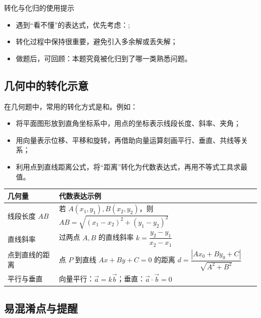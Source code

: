 \documentclass[a4paper,11pt]{ctexart}
\begin{document}
\begin{summarybox}{转化与化归的使用提示}
\begin{itemize}
  \item 遇到“看不懂”的表达式，优先考虑：;
  \item 转化过程中保持很重要，避免引入多余解或丢失解；
  \item 做题后，可回顾：本题究竟被化归到了哪一类熟悉问题。
\end{itemize}
\end{summarybox}

\subsection{几何中的转化示意}

在几何题中，常用的转化方式是和。例如：
\begin{itemize}
  \item 将平面图形放到直角坐标系中，用点的坐标表示线段长度、斜率、夹角；
  \item 用向量表示位移、平移和旋转，再借助向量运算刻画平行、垂直、共线等关系；
  \item 利用点到直线距离公式，将“距离”转化为代数表达式，再用不等式工具求最值。
\end{itemize}

\begin{center}

\vspace{0.5em}
\begin{tabular}{p{} p{}}
\hline
\textbf{几何量} & \textbf{代数表达示例} \\
\hline
线段长度 $AB$ & 若 $A(x_1,y_1),B(x_2,y_2)$，则 $AB=\sqrt{(x_1-x_2)^2+(y_1-y_2)^2}$ \\
直线斜率 & 过两点 $A,B$ 的直线斜率 $k=\dfrac{y_2-y_1}{x_2-x_1}$ \\
点到直线的距离 & 点 $P$ 到直线 $Ax+By+C=0$ 的距离 $d=\dfrac{|Ax_0+By_0+C|}{\sqrt{A^2+B^2}}$ \\
平行与垂直 & 向量平行：$\vec{a}=k\vec{b}$；垂直：$\vec{a}\cdot\vec{b}=0$ \\
\hline
\end{tabular}
\end{center}

\subsection{易混淆点与提醒}
\end{document}
